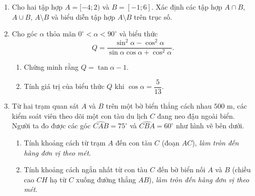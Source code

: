 \documentclass[12pt,a4paper]{article}
\begin{document}
\begin{enumerate}
\item Cho hai tập hợp $A = [-4; 2)$ và $B = [-1; 6]$.
Xác định các tập hợp $A \cap B$, $A \cup B$, $A \setminus B$ và biểu diễn tập hợp $A \setminus B$ trên trục số.
\item Cho góc $\alpha$ thỏa mãn $0^\circ < \alpha < 90^\circ$ và biểu thức
\[
Q = \frac{\sin^2\alpha - \cos^2\alpha}{\sin\alpha\cos\alpha + \cos^2\alpha}.
\]
\begin{enumerate}
\item Chứng minh rằng $Q = \tan\alpha - 1$.
\item Tính giá trị của biểu thức $Q$ khi $\cos\alpha = \dfrac{5}{13}$.
\end{enumerate}
\item Từ hai trạm quan sát $A$ và $B$ trên một bờ biển thẳng cách nhau $500\text{ m}$, các kiểm soát viên theo dõi một con tàu du lịch $C$ đang neo đậu ngoài biển. Người ta đo được các góc $\widehat{CAB} = 75^\circ$ và $\widehat{CBA} = 60^\circ$ như hình vẽ bên dưới.
\begin{enumerate}
\item Tính khoảng cách từ trạm $A$ đến con tàu $C$ (đoạn $AC$), \textit{làm tròn đến hàng đơn vị theo mét}.
\item Tính khoảng cách ngắn nhất từ con tàu $C$ đến bờ biển nối $A$ và $B$ (chiều cao $CH$ hạ từ $C$ xuống đường thẳng $AB$), \textit{làm tròn đến hàng đơn vị theo mét}.
\end{enumerate}
\begin{center}
\end{center}
\end{enumerate}
\end{document}
